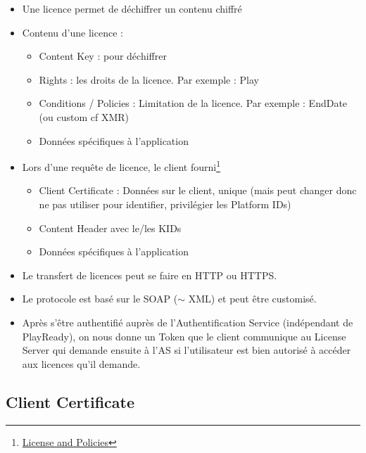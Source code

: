 \documentclass[french]{article}
\begin{document}
\begin{itemize}
	\item Une licence permet de déchiffrer un contenu chiffré
	
	\item Contenu d'une licence : 
	\begin{itemize}
		\item Content Key : pour déchiffrer
		\item Rights : les droits de la licence. Par exemple : Play
		\item Conditions / Policies : Limitation de la licence. Par exemple : EndDate (ou custom cf XMR)
		\item Données spécifiques à l'application
	\end{itemize}
	
	\item Lors d'une requête de licence, le client fourni\footnote{\href{https://learn.microsoft.com/en-us/playready/overview/license-and-policies}{License and Policies}}
	\begin{itemize}
		\item Client Certificate : Données sur le client, unique (mais peut changer donc ne pas utiliser pour identifier, privilégier les Platform IDs)
		\item Content Header avec le/les KIDs
		\item Données spécifiques à l'application
		
	\end{itemize}
	
	\item Le transfert de licences peut se faire en HTTP ou HTTPS.
	
	\item Le protocole est basé sur le SOAP ($\sim$ XML) et peut être customisé. 
	
	\item Après s'être authentifié auprès de l'Authentification Service (indépendant de PlayReady), on nous donne un Token que le client communique au License Server qui demande ensuite à l'AS si l'utilisateur est bien autorisé à accéder aux licences qu'il demande.
\end{itemize}


\subsection{Client Certificate}
\end{document}
